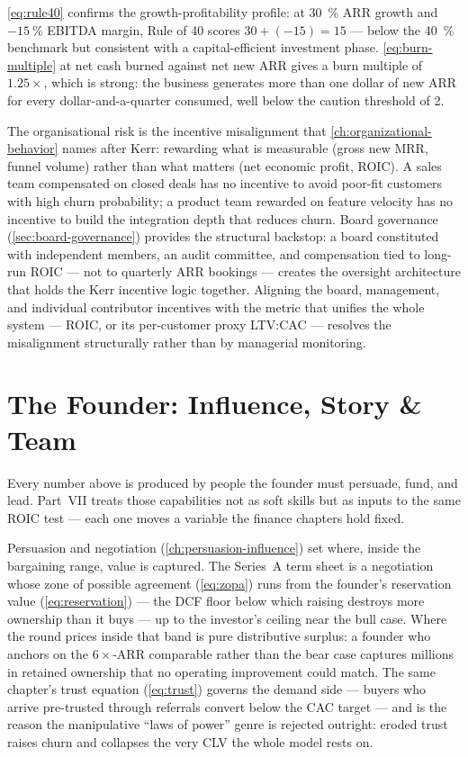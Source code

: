 \cref{eq:rule40} confirms the growth-profitability profile: at \qty{30}{\percent} ARR
growth and \(\qty{-15}{\percent}\) EBITDA margin, Rule of 40 scores \(30 + (-15) = 15\)
--- below the \qty{40}{\percent} benchmark but consistent with a capital-efficient
investment phase. \cref{eq:burn-multiple} at  net cash burned against
 net new ARR gives a burn multiple of \(1.25\times\), which is strong:
the business generates more than one dollar of new ARR for every dollar-and-a-quarter
consumed, well below the caution threshold of 2.

The organisational risk is the incentive misalignment that \cref{ch:organizational-behavior}
names after Kerr: rewarding what is measurable (gross new MRR, funnel volume) rather than
what matters (net economic profit, ROIC). A sales team compensated on closed deals has no
incentive to avoid poor-fit customers with high churn probability; a product team rewarded
on feature velocity has no incentive to build the integration depth that reduces churn.
Board governance (\cref{sec:board-governance}) provides the structural backstop: a board
constituted with independent members, an audit committee, and compensation tied to long-run
ROIC --- not to quarterly ARR bookings --- creates the oversight architecture that holds the
Kerr incentive logic together. Aligning the board, management, and individual contributor
incentives with the metric that unifies the whole system --- ROIC, or its per-customer proxy
LTV:CAC --- resolves the misalignment structurally rather than by managerial monitoring.

\section{The Founder: Influence, Story \& Team}\label{sec:capstone-founder}

Every number above is produced by people the founder must persuade, fund, and lead. Part~VII
treats those capabilities not as soft skills but as inputs to the same ROIC test --- each one
moves a variable the finance chapters hold fixed.

Persuasion and negotiation (\cref{ch:persuasion-influence}) set where, inside the bargaining
range, value is captured. The Series~A term sheet is a negotiation whose zone of possible
agreement (\cref{eq:zopa}) runs from the founder's reservation value (\cref{eq:reservation})
--- the  DCF floor below which raising destroys more ownership than it buys ---
up to the investor's ceiling near the  bull case. Where the round prices inside
that band is pure distributive surplus: a founder who anchors on the \(6\times\)-ARR comparable
rather than the bear case captures millions in retained ownership that no operating improvement
could match. The same chapter's trust equation (\cref{eq:trust}) governs the demand side ---
buyers who arrive pre-trusted through referrals convert below the  CAC target ---
and is the reason the manipulative ``laws of power'' genre is rejected outright: eroded trust
raises churn and collapses the very CLV the whole model rests on.

